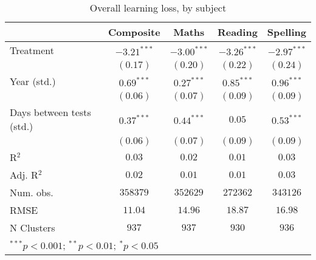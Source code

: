 
\begin{table}
\begin{center}
\begin{tabular}{l c c c c}
\hline
 & Composite & Maths & Reading & Spelling \\
\hline
Treatment                 & $-3.21^{***}$ & $-3.00^{***}$ & $-3.26^{***}$ & $-2.97^{***}$ \\
                          & $(0.17)$      & $(0.20)$      & $(0.22)$      & $(0.24)$      \\
Year (std.)               & $0.69^{***}$  & $0.27^{***}$  & $0.85^{***}$  & $0.96^{***}$  \\
                          & $(0.06)$      & $(0.07)$      & $(0.09)$      & $(0.09)$      \\
Days between tests (std.) & $0.37^{***}$  & $0.44^{***}$  & $0.05$        & $0.53^{***}$  \\
                          & $(0.06)$      & $(0.07)$      & $(0.09)$      & $(0.09)$      \\
\hline
R$^2$                     & $0.03$        & $0.02$        & $0.01$        & $0.03$        \\
Adj. R$^2$                & $0.02$        & $0.01$        & $0.01$        & $0.03$        \\
Num. obs.                 & $358379$      & $352629$      & $272362$      & $343126$      \\
RMSE                      & $11.04$       & $14.96$       & $18.87$       & $16.98$       \\
N Clusters                & $937$         & $937$         & $930$         & $936$         \\
\hline
\multicolumn{5}{l}{\scriptsize{$^{***}p<0.001$; $^{**}p<0.01$; $^{*}p<0.05$}}
\end{tabular}
\caption{Overall learning loss, by subject}
\label{table:overall}
\end{center}
\end{table}
